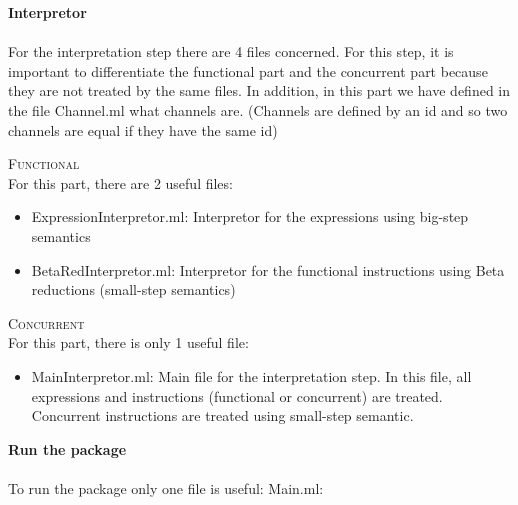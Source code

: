 \documentclass[11pt]{report}
\begin{document}
{} 
\tabto{0cm} {\LARGE \textbf{Interpretor}}
\\ \\
For the interpretation step there are 4 files concerned. For this step, it is important to differentiate the functional part and the concurrent part because they are not treated by the same files. In addition, in this part we have defined in the file Channel.ml what channels are. (Channels are defined by an id and so two channels are equal if they have the same id)
\vspace*{10pt}
{}
\tabto{1cm} {\Large \textsc{Functional}}
\\
For this part, there are 2 useful files:
\begin{itemize}
\item ExpressionInterpretor.ml: Interpretor for the expressions using big-step semantics
\item BetaRedInterpretor.ml: Interpretor for the functional instructions using Beta reductions (small-step semantics)
\end{itemize}

{} 
\tabto{1cm} {\Large \textsc{Concurrent}}
\\
For this part, there is only 1 useful file:
\begin{itemize}
\item MainInterpretor.ml: Main file for the interpretation step. In this file, all expressions and instructions (functional or concurrent) are treated. Concurrent instructions are treated using small-step semantic.
\end{itemize}


{}
\tabto{0cm} {\LARGE \textbf{Run the package}}
\\ \\
To run the package only one file is useful: Main.ml: \\ 
\end{document}
